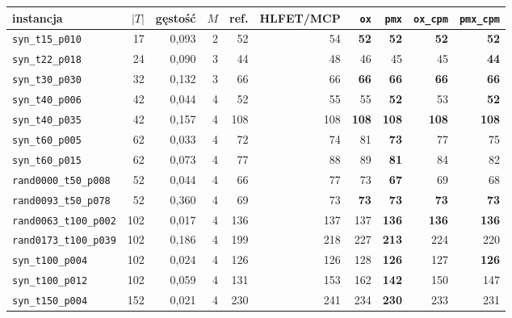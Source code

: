 \documentclass[pdflatex,sn-mathphys,Numbered]{sn-jnl}
\begin{document}
\begin{table}[ht]
\centering\scriptsize\setlength{\tabcolsep}{3pt}
\begin{tabular}{lrrrrrrrrr}
\toprule
instancja & $|T|$ & gęstość & $M$ & ref. & HLFET/MCP & \texttt{ox} & \texttt{pmx} & \texttt{ox\_cpm} & \texttt{pmx\_cpm} \\
\midrule
\texttt{syn\_t15\_p010}       &  17 & 0{,}093 & 2 &  52 &   54 & \textbf{52}  & \textbf{52}  & \textbf{52}  & \textbf{52} \\
\texttt{syn\_t22\_p018}       &  24 & 0{,}090 & 3 &  44 &   48 & 46           & 45           & 45           & \textbf{44} \\
\texttt{syn\_t30\_p030}       &  32 & 0{,}132 & 3 &  66 &   66 & \textbf{66}  & \textbf{66}  & \textbf{66}  & \textbf{66} \\
\texttt{syn\_t40\_p006}       &  42 & 0{,}044 & 4 &  52 &   55 & 55           & \textbf{52}  & 53           & \textbf{52} \\
\texttt{syn\_t40\_p035}       &  42 & 0{,}157 & 4 & 108 &  108 & \textbf{108} & \textbf{108} & \textbf{108} & \textbf{108} \\
\texttt{syn\_t60\_p005}       &  62 & 0{,}033 & 4 &  72 &   74 & 81           & \textbf{73}  & 77           & 75 \\
\texttt{syn\_t60\_p015}       &  62 & 0{,}073 & 4 &  77 &   88 & 89           & \textbf{81}  & 84           & 82 \\
\texttt{rand0000\_t50\_p008}  &  52 & 0{,}044 & 4 &  66 &   77 & 73           & \textbf{67}  & 69           & 68 \\
\texttt{rand0093\_t50\_p078}  &  52 & 0{,}360 & 4 &  69 &   73 & \textbf{73}  & \textbf{73}  & \textbf{73}  & \textbf{73} \\
\texttt{rand0063\_t100\_p002} & 102 & 0{,}017 & 4 & 136 &  137 & 137          & \textbf{136} & \textbf{136} & \textbf{136} \\
\texttt{rand0173\_t100\_p039} & 102 & 0{,}186 & 4 & 199 &  218 & 227          & \textbf{213} & 224          & 220 \\
\texttt{syn\_t100\_p004}      & 102 & 0{,}024 & 4 & 126 &  126 & 128          & \textbf{126} & 127          & \textbf{126} \\
\texttt{syn\_t100\_p012}      & 102 & 0{,}059 & 4 & 131 &  153 & 162          & \textbf{142} & 150          & 147 \\
\texttt{syn\_t150\_p004}      & 152 & 0{,}021 & 4 & 230 &  241 & 234          & \textbf{230} & 233          & 231 \\

\end{tabular}
\end{table}
\end{document}
